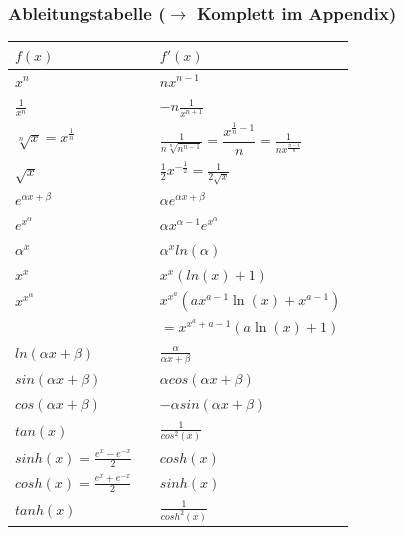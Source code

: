 \documentclass[6pt]{article}
\begin{document}
\begin{multicols*}{3}
				
		\subsubsection*{Ableitungstabelle ($\rightarrow$ Komplett im Appendix)}
		\begin{onehalfspace}
			\begin{tabular}{ l | l l }
					$ f(x)$	\hspace{15mm}	& 	\hspace{1mm} &  $f'(x)$ \\ \hline
					$x^n$												&&	$nx^{n-1}$																							\\
					$\frac{1}{x^n}$									&&	$-n \frac{1}{x^{n+1}}$																			\\
					$\sqrt[n] x = x^{\frac{1}{n}}$			&&			$\frac{1}{n \sqrt[n]{n^{n-1}}} = \dfrac{x^{\frac{1}{n}-1}}{n} = 
																					\frac{1}{n {x}^{\frac{n-1}{n}}} $ 																\\
					$\sqrt {x}$										&&			$\frac{1}{2} x^{-\frac{1}{2}} =  \frac{1}{2 \sqrt{x}}$ 						\\
					$e^{\alpha x + \beta}$						&&		$\alpha e^{\alpha x + \beta}$ 															\\
					$e^{x^\alpha}$									&&		$\alpha x^{\alpha -1}  e^{x^\alpha}$ 												\\
					$\alpha^x$										&&		$\alpha^x ln(\alpha)$ 																		\\
					$x^x$												&&		$x^x (ln(x) + 1)$ 																				\\
					$x^{x^\alpha}$									&&		$x^{x^a}\left(ax^{a-1}\ln\left(x\right)+x^{a-1}\right) 	$					\\
																			&&		$= x^{x^a+a-1}\left(a\ln\left(x\right)+1\right)$ 							\\
					$ln(\alpha x + \beta)$						&&		$\frac{\alpha}{\alpha x + \beta}$ 													\\	
					$sin(\alpha x + \beta)$					&&		$\alpha cos(\alpha x + \beta)$ 														\\
					$cos(\alpha x + \beta)$					&&		$-\alpha sin(\alpha x + \beta)$ 														\\
					$tan(x)$											&&		$\frac{1}{cos^2(x)}$ 																			\\
					$sinh(x) = \frac{e^x - e^{-x}}{2}$		&&		$cosh(x)$ 																						\\
					$cosh(x) = \frac{e^x + e^{-x}}{2}$		&&		$sinh(x)$ 																							\\
					$tanh(x)$											&&		$\frac{1}{cosh^2(x)}$ 																		\\
			\end{tabular}
		\end{onehalfspace}


\end{multicols*}
\end{document}
